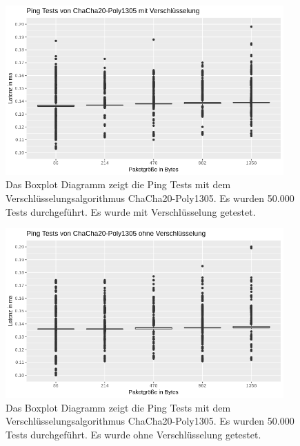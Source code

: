 \begin{figure}[!p]
\centering
\includegraphics[width=0.95\textwidth]{images/chachaEping.png}
\caption[Ping Diagramm mit ChaCha20-Poly1305 mit Verschlüsselung]{Das Boxplot Diagramm zeigt die Ping Tests mit dem Verschlüsselungsalgorithmus ChaCha20-Poly1305. Es wurden 50.000 Tests durchgeführt. Es wurde mit Verschlüsselung getestet. }
\label{img:CPU-WE4}
\end{figure}
\begin{figure}[!p]
\centering
\includegraphics[width=0.95\textwidth]{images/chachaweping.png}
\caption[Ping Diagramm mit ChaCha20-Poly1305 ohne Verschlüsselung]{Das Boxplot Diagramm zeigt die Ping Tests mit dem Verschlüsselungsalgorithmus ChaCha20-Poly1305. Es wurden 50.000 Tests durchgeführt. Es wurde ohne Verschlüsselung getestet. }
\label{img:CPU-WE5}
\end{figure}

